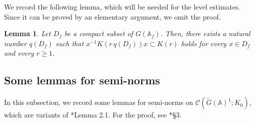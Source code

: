 \documentclass[12pt]{amsart}
\theoremstyle{definition}
\theoremstyle{plain}
\newtheorem{lemma}[definition]{Lemma}
\theoremstyle{remark}
\def\A{\mathbb{A}}%
\newcommand{\cC}{\mathcal{C}}
\numberwithin{equation}{section}
\newcommand{\tG}{\widetilde{G}}
\begin{document}
We record the following lemma, which will be needed for the level estimates. Since it can be proved by an elementary argument, we omit the proof.
\begin{lemma}\label{lem:levelbound}
Let $D_f$ be a compact subset of $G(\A_f)$. 
Then, there exists a natural number $q(D_f)$ such that $x^{-1} K(r\, q(D_f)) x\subset K(r)$ holds for every $x\in D_f$ and every $r\geq1$.
\end{lemma}


\subsection{Some lemmas for semi-norms}


In this subsection, we record some lemmas for semi-norms on $\cC(\tG(\A)^1;K_0)$, which are variants of \cite{FL16}*{Lemma 2.1}.
For the proof, see \cite{FL11semi}*{\S3}. 
\end{document}
